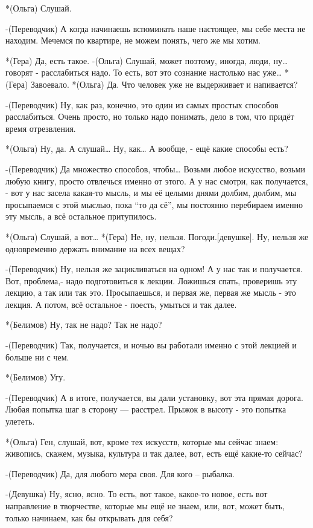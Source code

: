 *(Ольга) Слушай.

-(Переводчик) А когда начинаешь вспоминать наше настоящее,  мы себе места не находим. Мечемся по квартире, не можем понять, чего же мы хотим.

*(Гера) Да, есть такое.
-(Ольга) Слушай, может поэтому, иногда, люди, ну… говорят - расслабиться надо. То есть, вот это сознание настолько  нас уже…
*(Гера) Завоевало.
*(Ольга) Да. Что человек уже не выдерживает и напивается?

-(Переводчик) Ну, как раз, конечно, это один из самых простых способов расслабиться. Очень просто, но только надо понимать, дело в том, что придёт время отрезвления. 

*(Ольга) Ну, да. А слушай… Ну, как… А вообще, - ещё какие способы есть? 

-(Переводчик) Да множество способов, чтобы… Возьми любое искусство, возьми любую книгу, просто отвлечься именно от этого. А у нас смотри, как получается, - вот у нас засела какая-то мысль, и мы её целыми днями долбим, долбим, мы просыпаемся с этой мыслью, пока “то да сё”, мы постоянно перебираем именно эту мысль, а всё остальное притупилось.

*(Ольга) Слушай, а вот…
*(Гера) Не, ну, нельзя. Погоди.[девушке]. Ну, нельзя же одновременно держать внимание на всех вещах?

-(Переводчик) Ну, нельзя же зацикливаться на одном! А у нас так и получается. Вот, проблема,-  надо подготовиться к лекции. Ложишься спать, проверишь эту лекцию, а так или так это. Просыпаешься, и первая же, первая же мысль - это лекция. А потом, всё остальное - поесть, умыться и так далее.

*(Белимов) Ну, так не надо? Так не надо?

-(Переводчик) Так, получается, и ночью вы работали именно с этой лекцией и больше ни с чем. 

*(Белимов) Угу.

-(Переводчик) А в итоге, получается, вы дали установку, вот эта прямая дорога. Любая попытка шаг в сторону — расстрел. Прыжок в высоту - это попытка улететь. 

*(Ольга) Ген, слушай, вот, кроме тех искусств, которые мы сейчас знаем: живопись, скажем, музыка, культура и так далее, вот, есть ещё какие-то сейчас?

-(Переводчик) Да, для любого  мера своя. Для кого – рыбалка.

-(Девушка) Ну, ясно, ясно. То есть, вот такое, какое-то новое, есть вот направление в творчестве, которые мы ещё не знаем, или, вот, может быть, только начинаем, как бы открывать для себя?


